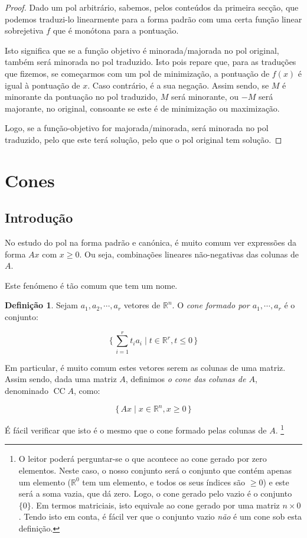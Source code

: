 \documentclass{article}
\DeclareMathOperator{\CC}{CC}
\newcommand{\R}{\mathbb{R}}
\theoremstyle{definition}
\newtheorem{definition}{Definição}
\begin{document}
	\begin{proof}
	Dado um pol arbitrário, sabemos, pelos conteúdos da primeira secção, que podemos traduzi-lo linearmente para a forma padrão com uma certa função linear sobrejetiva $f$ que é monótona para a pontuação.
	
	Isto significa que se a função objetivo é minorada/majorada no pol original, também será minorada no pol traduzido. Isto pois repare que, para as traduções que fizemos, se começarmos com um pol de minimização, a pontuação de $f(x)$ é igual à pontuação de $x$. Caso contrário, é a sua negação. Assim sendo, se $M$ é minorante da pontuação no pol traduzido, $M$ será minorante, ou $-M$ será majorante, no original, consoante se este é de minimização ou maximização.
	
	Logo, se a função-objetivo for majorada/minorada, será minorada no pol traduzido, pelo que este terá solução, pelo que o pol original tem solução.
	\end{proof}
	
	\section{Cones}
	
	\subsection{Introdução}
	
	No estudo do pol na forma padrão e canónica, é muito comum ver expressões da forma $Ax$ com $x \geq 0$. Ou seja, combinações lineares não-negativas das colunas de $A$.
	
	Este fenómeno é tão comum que tem um nome.
	
	\begin{definition}
	Sejam $a_1, a_2, \cdots, a_r$ vetores de $\R^n$. O \emph{cone formado por $a_1, \cdots, a_r$} é o conjunto:
	
	\[\{\, \sum_{i=1}^r t_i a_i \mid t \in \R^r, t \leq 0\,\}\]
	
	Em particular, é muito comum estes vetores serem as colunas de uma matriz. Assim sendo, dada uma matriz $A$, definimos \emph{o cone das colunas de $A$}, denominado $\CC A$, como:
	
	\[\{\, Ax \mid x \in \R^n, x \geq 0\,\}\]
	
	É fácil verificar que isto é o mesmo que o cone formado pelas colunas de $A$. \footnote{O leitor poderá perguntar-se o que acontece ao cone gerado por zero elementos. Neste caso, o nosso conjunto será o conjunto que contém apenas um elemento ($\R^0$ tem um elemento, e todos os seus índices são $\geq 0$) e este será a soma vazia, que dá zero. Logo, o cone gerado pelo vazio é o conjunto $\{0\}$. Em termos matriciais, isto equivale ao cone gerado por uma matriz $n \times 0$. Tendo isto em conta, é fácil ver que o conjunto vazio \emph{não} é um cone sob esta definição.}
	\end{definition}
	
\end{document}
